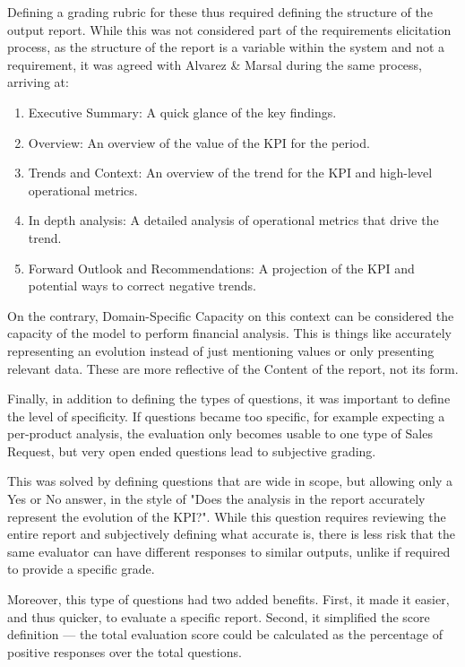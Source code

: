 \documentclass[a4paper]{report}
\begin{document}
Defining a grading rubric for these thus required defining the structure of the output report. While this was not considered part of the requirements elicitation process, as the structure of the report is a variable within the system and not a requirement, it was agreed with Alvarez \& Marsal during the same process, arriving at:

\begin{enumerate}
    \item Executive Summary: A quick glance of the key findings.
    \item Overview: An overview of the value of the KPI for the period.
    \item Trends and Context: An overview of the trend for the KPI and high-level operational metrics.
    \item In depth analysis: A detailed analysis of operational metrics that drive the trend.
    \item Forward Outlook and Recommendations: A projection of the KPI and potential ways to correct negative trends.
\end{enumerate}

On the contrary, Domain-Specific Capacity on this context can be considered the capacity of the model to perform financial analysis. This is things like accurately representing an evolution instead of just mentioning values or only presenting relevant data. These are more reflective of the Content of the report, not its form.

Finally, in addition to defining the types of questions, it was important to define the level of specificity. If questions became too specific, for example expecting a per-product analysis, the evaluation only becomes usable to one type of Sales Request, but very open ended questions lead to subjective grading.

This was solved by defining questions that are wide in scope, but allowing only a Yes or No answer, in the style of "Does the analysis in the report accurately represent the evolution of the KPI?". While this question requires reviewing the entire report and subjectively defining what accurate is, there is less risk that the same evaluator can have different responses to similar outputs, unlike if required to provide a specific grade.

Moreover, this type of questions had two added benefits. First, it made it easier, and thus quicker, to evaluate a specific report. Second, it simplified the score definition --- the total evaluation score could be calculated as the percentage of positive responses over the total questions.
\end{document}
